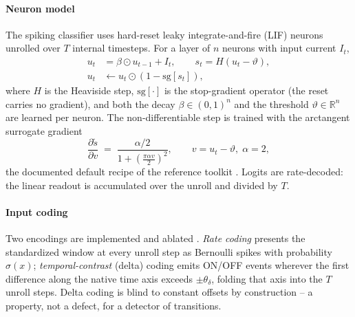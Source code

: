 \documentclass[review,12pt]{elsarticle}
\begin{document}
\paragraph{Neuron model}
The spiking classifier uses hard-reset leaky integrate-and-fire (LIF)
neurons unrolled over $T$ internal timesteps. For a layer of $n$ neurons
with input current $I_t$,
\begin{equation}
\begin{aligned}
u_t &= \beta \odot u_{t-1} + I_t, \qquad
s_t = H\!\left(u_t - \vartheta\right), \\[2pt]
u_t &\leftarrow u_t \odot \left(1 - \mathrm{sg}[s_t]\right),
\end{aligned}
\label{eq:lif}
\end{equation}
where $H$ is the Heaviside step, $\mathrm{sg}[\cdot]$ is the stop-gradient
operator (the reset carries no gradient), and both the decay
$\beta\in(0,1)^n$ and the threshold $\vartheta\in\mathbb{R}^n$ are learned
per neuron. The non-differentiable step is trained with the arctangent
surrogate gradient
\begin{equation}
\frac{\partial \tilde{s}}{\partial v} \;=\; \frac{\alpha/2}{1 + \left(\tfrac{\pi \alpha v}{2}\right)^2},
\qquad v = u_t - \vartheta,\; \alpha = 2 ,
\label{eq:surrogate}
\end{equation}
the documented default recipe of the reference toolkit
\cite{eshraghian2023,fang2023spikingjelly}. Logits are rate-decoded: the
linear readout is accumulated over the unroll and divided by $T$.

\paragraph{Input coding}
Two encodings are implemented and ablated \cite{auge2021}. \emph{Rate
coding} presents the standardized window at every unroll step as Bernoulli
spikes with probability $\sigma(x)$; \emph{temporal-contrast} (delta)
coding emits ON/OFF events wherever the first difference along the native
time axis exceeds $\pm\theta_\delta$, folding that axis into the $T$
unroll steps. Delta coding is blind to constant offsets by construction --
a property, not a defect, for a detector of transitions.
\end{document}
